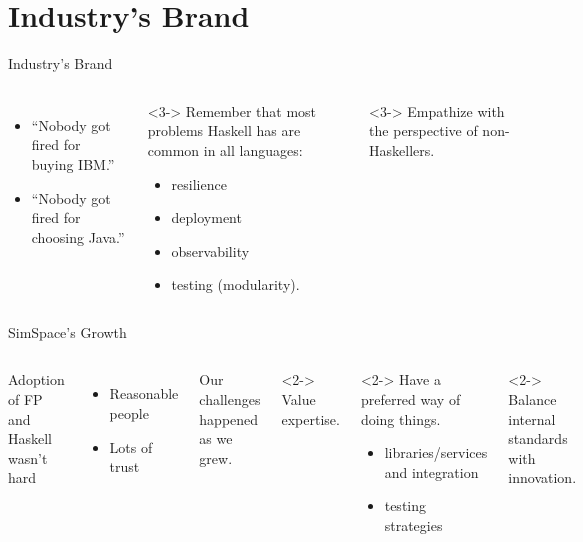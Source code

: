 \documentclass[aspectratio=169,ignorenonframetext]{beamer}
\begin{document}
\section{Industry's Brand}

\begin{frame}{Industry's Brand}
	\begin{columns}
		\begin{itemize}
			\item<1-> ``Nobody got fired for buying IBM.''
			\item<2-> ``Nobody got fired for choosing Java.''
		\end{itemize}
		\begin{exampleblock}<3->{}
			Remember that most problems Haskell has are common in all languages:
			\begin{itemize}
				\item resilience
				\item deployment
				\item observability
				\item testing (modularity).
			\end{itemize}
		\end{exampleblock}
		\begin{exampleblock}<3->{}
			Empathize with the perspective of non-Haskellers.
		\end{exampleblock}
	\end{columns}
\end{frame}

\begin{frame}{SimSpace's Growth}
	\begin{columns}
		\column{.5\textwidth}
		Adoption of FP and Haskell wasn't hard
		\begin{itemize}
			\item Reasonable people
			\item Lots of trust
		\end{itemize}
		Our challenges happened as we grew.
		\column{.5\textwidth}
		\begin{exampleblock}<2->{}
			Value expertise.
		\end{exampleblock}
		\begin{exampleblock}<2->{}
			Have a preferred way of doing things.
			\begin{itemize}
					\item libraries/services and integration
					\item testing strategies
			\end{itemize}
		\end{exampleblock}
		\begin{exampleblock}<2->{}
			Balance internal standards with innovation.
		\end{exampleblock}
	\end{columns}
\end{frame}
\end{document}
